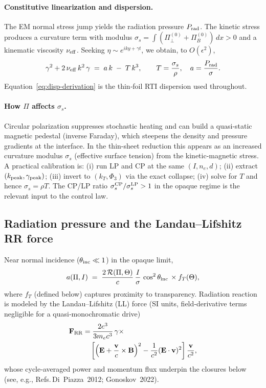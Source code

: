 \documentclass[aps,pre,twocolumn,showpacs,superscriptaddress]{revtex4-2}
\theoremstyle{definition}
\begin{document}
\paragraph{Constitutive linearization and dispersion.}
The EM normal stress jump yields the radiation pressure $P_{\rm rad}$. The kinetic stress produces a curvature term with modulus $\sigma_s=\int(\Pi_\perp^{(0)}+\Pi_B^{(0)})\,dx>0$ and a kinematic viscosity $\nu_{\rm eff}$. Seeking $\eta\sim e^{i k y+\gamma t}$, we obtain, to $O(\epsilon^2)$,
\begin{equation}\label{eq:disp-derivation}
\gamma^2 + 2\,\nu_{\rm eff}\,k^2\,\gamma \;=\; a\,k \;-\; T\,k^3,\qquad T=\frac{\sigma_s}{\rho},\quad a=\frac{P_{\rm rad}}{\sigma}.
\end{equation}
Equation~\eqref{eq:disp-derivation} is the thin‑foil RTI dispersion used throughout.

\paragraph*{How $\Pi$ affects $\sigma_s$.}
Circular polarization suppresses stochastic heating and can build a quasi-static magnetic pedestal (inverse Faraday), which steepens the density and pressure gradients at the interface. In the thin-sheet reduction this appears as an increased curvature modulus $\sigma_s$ (effective surface tension) from the kinetic-magnetic stress. A practical calibration is: (i) run LP and CP at the same $(I,n_e,d)$; (ii) extract $(k_{\rm peak},\gamma_{\rm peak})$; (iii) invert to $(k_T,\Phi_3)$ via the exact collapse; (iv) solve for $T$ and hence $\sigma_s=\rho T$. The CP/LP ratio $\sigma_s^{\rm CP}/\sigma_s^{\rm LP}>1$ in the opaque regime is the relevant input to the control law.

\subsection{Radiation pressure and the Landau–Lifshitz RR force}\label{subsec:LL}

Near normal incidence ($\theta_{\rm inc}\ll 1$) in the opaque limit,
\begin{equation}\label{eq:a-opaque}
a(\Pi,I)\;=\;\frac{2\,\mathcal{R}(\Pi,\Theta)}{c}\,\frac{I}{\sigma}\,\cos^2\theta_{\rm inc}\,\times f_T(\Theta),
\end{equation}
where $f_T$ (defined below) captures proximity to transparency. Radiation reaction is modeled by the Landau–Lifshitz (LL) force (SI units, field‑derivative terms negligible for a quasi‑monochromatic drive)
\begin{align}\label{eq:LL}
\mathbf{F}_{\rm RR}&=\frac{2e^3}{3m_e c^3}\,\gamma\times\nonumber\\
&\quad\left[\left(\mathbf{E}+\frac{\mathbf{v}}{c}\times\mathbf{B}\right)^2 - \frac{1}{c^2}(\mathbf{E}\cdot\mathbf{v})^2\right]\frac{\mathbf{v}}{c^2},
\end{align}
whose cycle‑averaged power and momentum flux underpin the closures below (see, e.g., Refs.\,Di~Piazza~2012; Gonoskov~2022).
\end{document}
